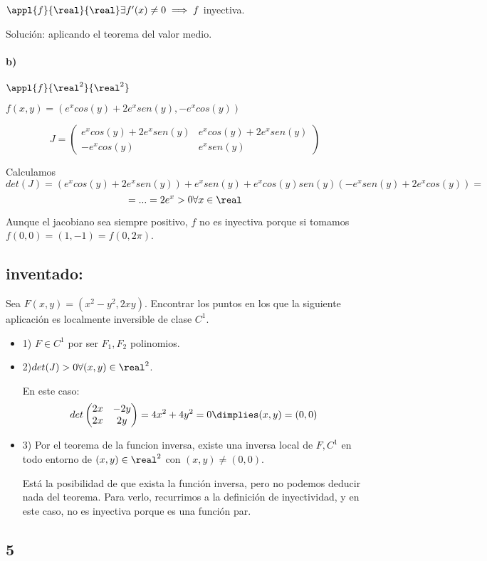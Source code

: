 \documentclass{apuntes}
\begin{document}
$\appl{f}{\real}{\real} \exists f'(x) \neq 0 \implies f$ inyectiva.

Solución: aplicando el teorema del valor medio.

\paragraph{b)}
$\appl{f}{\real^2}{\real^2}$

$f(x,y) =( e^xcos(y) + 2e^xsen(y),-e^xcos(y))$

$$J = \begin{pmatrix}
       e^xcos(y)+2e^xsen(y) & e^xcos(y)+2e^xsen(y) \\
       -e^xcos(y) & e^xsen(y)
      \end{pmatrix}
$$

Calculamos $$det(J) = (e^xcos(y)+2e^xsen(y))+e^xsen(y) + e^xcos(y)sen(y)(-e^xsen(y)+2e^xcos(y)) = $$
$$ = ... = 2e^x > 0 \forall x \in \real$$

Aunque el jacobiano sea siempre positivo, $f$ no es inyectiva porque si tomamos $f(0,0) = (1,-1) = f(0,2\pi)$.

\subsection{inventado:}
\label{inventado}
Sea $F(x,y) = (x^2-y^2,2xy)$. Encontrar los puntos en los que la siguiente aplicación es localmente inversible de clase $C^1$.

\begin{itemize}
 \item 1) $F \in C^1$ por ser $F_1,F_2$ polinomios.
 \item 2)$det(J)>0 \forall (x,y)\in \real^2$. 
 
 En este caso: $$det\begin{pmatrix}
                  2x&-2y\\
                  2x&2y
                 \end{pmatrix} = 4x^2 + 4y^2 = 0 \dimplies (x,y) = (0,0)$$           
 \item 3) Por el teorema de la funcion inversa, existe una inversa local de $F,C^1$ en todo entorno de $(x,y) \in \real^2$ con $(x,y)\neq (0,0)$. 
 
 Está la posibilidad de que exista la función inversa, pero no podemos deducir nada del teorema. Para verlo, recurrimos a la definición de inyectividad, y en este caso, no es inyectiva porque es una función par.
 \end{itemize}
 \subsection{5}
\end{document}
